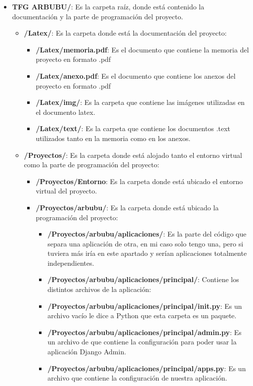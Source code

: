 \begin{itemize}
	\item \textbf{TFG ARBUBU/}: Es la carpeta raíz, donde está contenido la documentación y la parte de programación del proyecto.
	\begin{itemize}
		\item \textbf{/Latex/}: Es la carpeta donde está la documentación del proyecto:
		\begin{itemize}
			\item \textbf{/Latex/memoria.pdf}: Es el documento que contiene la memoria del proyecto en formato .pdf
			\item \textbf{/Latex/anexo.pdf}: Es el documento que contiene los anexos del proyecto en formato .pdf
			\item \textbf{/Latex/img/}: Es la carpeta que contiene las imágenes utilizadas en el documento latex.
			\item \textbf{/Latex/text/}: Es la carpeta que contiene los documentos .text utilizados tanto en la memoria como en los anexos.
		\end{itemize}
		\item \textbf{/Proyectos/}: Es la carpeta donde está alojado tanto el entorno virtual como la parte de programación del proyecto:
		\begin{itemize}
			\item \textbf{/Proyectos/Entorno}: Es la carpeta donde está ubicado el entorno virtual del proyecto.
			\item \textbf{/Proyectos/arbubu/}: Es la carpeta donde está ubicado la programación del proyecto:
			\begin{itemize}
				\item \textbf{/Proyectos/arbubu/aplicaciones/}: Es la parte del código que separa una aplicación de otra, en mi caso solo tengo una, pero si tuviera más iría en este apartado y serían aplicaciones totalmente independientes.
				\item \textbf{/Proyectos/arbubu/aplicaciones/principal/}: Contiene los distintos archivos de la aplicación:
				\item \textbf{/Proyectos/arbubu/aplicaciones/principal/init.py}: Es un archivo vacío le dice a Python que esta carpeta es un paquete.
				\item \textbf{/Proyectos/arbubu/aplicaciones/principal/admin.py}: Es un archivo de que contiene la configuración para poder usar la aplicación Django Admin.
				\item \textbf{/Proyectos/arbubu/aplicaciones/principal/apps.py}: Es un archivo que contiene la configuración de nuestra aplicación.

\end{itemize}
\end{itemize}
\end{itemize}
\end{itemize}
